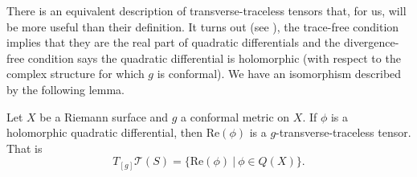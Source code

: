 There is an equivalent description of transverse-traceless tensors that, for us, will be more useful than their definition. 
It turns out (see \cite{tromba1992}), the trace-free condition implies that they are the real part of quadratic differentials and the divergence-free condition says the quadratic differential is holomorphic (with respect to the complex structure for which $g$ is conformal). 
We have an isomorphism described by the following lemma.

\begin{lem} \label{tangent-teich}
Let $X$ be a Riemann surface and $g$ a conformal metric on $X$. 
If $\phi$ is a holomorphic quadratic differential, then $\mathrm{Re}(\phi)$ is a $g$-transverse-traceless tensor. 
That is 
\[
T_{[g]}\mathcal{T}(S) = \{\mathrm{Re}(\phi) \ | \ \phi \in Q(X) \}.
\]
\end{lem}
